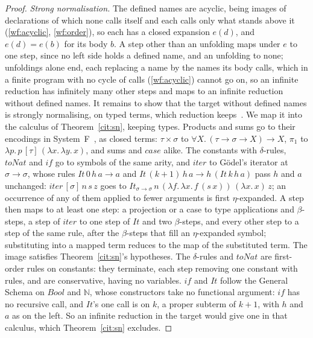 \begin{proof}
\emph{Strong normalisation.}
The defined names are acyclic, being images of declarations of which none calls itself and each calls only what stands above it (\ref{wf:acyclic}, \ref{wf:order}), so each has a closed expansion $e(d)$, and $e(d) = e(b)$ for its body $b$.
A step other than an unfolding maps under $e$ to one step, since no left side holds a defined name, and an unfolding to none; unfoldings alone end, each replacing a name by the names its body calls, which in a finite program with no cycle of calls (\ref{wf:acyclic}) cannot go on, so an infinite reduction has infinitely many other steps and maps to an infinite reduction without defined names.
It remains to show that the target without defined names is strongly normalising, on typed terms, which reduction keeps~\cite{girard1989proofs}.
We map it into the calculus of Theorem~\ref{cit:sn}, keeping types.
Products and sums go to their encodings in System~F~\cite[Sections~11.3.2 and~11.3.4]{girard1989proofs}, as closed terms: $\tau \times \sigma$ to $\forall X.\,(\tau \to \sigma \to X) \to X$, $\pi_1$ to $\lambda p.\,p\,[\tau]\,(\lambda x.\,\lambda y.\,x)$, and sums and $\mathit{case}$ alike.
The constants with $\delta$-rules, $\mathit{toNat}$ and $\mathit{if}$ go to symbols of the same arity, and $\mathit{iter}$ to G\"odel's iterator at $\sigma \to \sigma$, whose rules $\mathit{It}\,0\,h\,a \longrightarrow a$ and $\mathit{It}\,(k{+}1)\,h\,a \longrightarrow h\,(\mathit{It}\,k\,h\,a)$ pass $h$ and $a$ unchanged:
$\mathit{iter}\,[\sigma]\,n\,s\,z$ goes to $\mathit{It}_{\sigma \to \sigma}\,n\,(\lambda f.\,\lambda x.\,f\,(s\,x))\,(\lambda x.\,x)\,z$; an occurrence of any of them applied to fewer arguments is first $\eta$-expanded.
A step then maps to at least one step: a projection or a case to type applications and $\beta$-steps, a step of $\mathit{iter}$ to one step of $\mathit{It}$ and two $\beta$-steps, and every other step to a step of the same rule, after the $\beta$-steps that fill an $\eta$-expanded symbol; substituting into a mapped term reduces to the map of the substituted term.
The image satisfies Theorem~\ref{cit:sn}'s hypotheses.
The $\delta$-rules and $\mathit{toNat}$ are first-order rules on constants: they terminate, each step removing one constant with rules, and are conservative, having no variables.
$\mathit{if}$ and $\mathit{It}$ follow the General Schema on $\mathit{Bool}$ and $\mathbb{N}$, whose constructors take no functional argument: $\mathit{if}$ has no recursive call, and $\mathit{It}$'s one call is on $k$, a proper subterm of $k{+}1$, with $h$ and $a$ as on the left.
So an infinite reduction in the target would give one in that calculus, which Theorem~\ref{cit:sn} excludes.
\end{proof}

